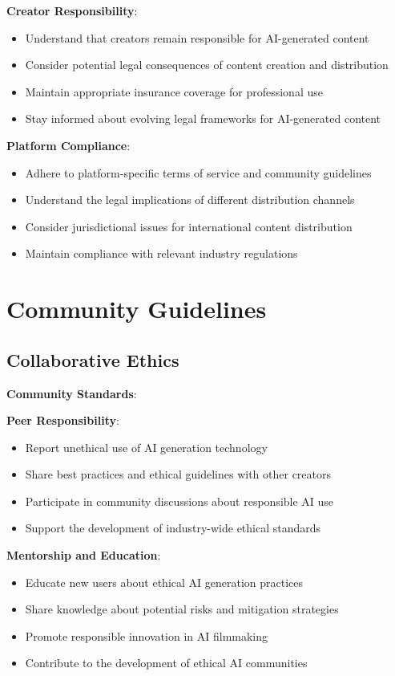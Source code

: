 \textbf{Creator Responsibility}:
\begin{itemize}
\item Understand that creators remain responsible for AI-generated content
\item Consider potential legal consequences of content creation and distribution
\item Maintain appropriate insurance coverage for professional use
\item Stay informed about evolving legal frameworks for AI-generated content
\end{itemize}

\textbf{Platform Compliance}:
\begin{itemize}
\item Adhere to platform-specific terms of service and community guidelines
\item Understand the legal implications of different distribution channels
\item Consider jurisdictional issues for international content distribution
\item Maintain compliance with relevant industry regulations
\end{itemize}

\section{Community Guidelines}

\subsection{Collaborative Ethics}
\textbf{Community Standards}:

\textbf{Peer Responsibility}:
\begin{itemize}
\item Report unethical use of AI generation technology
\item Share best practices and ethical guidelines with other creators
\item Participate in community discussions about responsible AI use
\item Support the development of industry-wide ethical standards
\end{itemize}

\textbf{Mentorship and Education}:
\begin{itemize}
\item Educate new users about ethical AI generation practices
\item Share knowledge about potential risks and mitigation strategies
\item Promote responsible innovation in AI filmmaking
\item Contribute to the development of ethical AI communities
\end{itemize}

